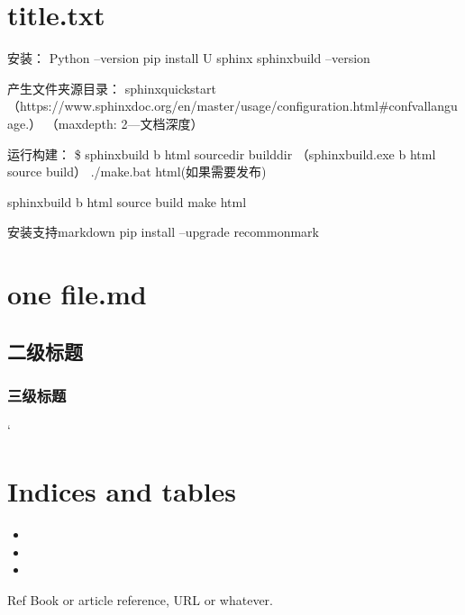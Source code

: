 \documentclass[letterpaper,10pt,english]{sphinxhowto}
\begin{document}
\section{title.txt}
\label{\detokenize{12.8:title-txt}}\label{\detokenize{12.8::doc}}
安装：
Python –version
pip install \sphinxhyphen{}U sphinx
sphinx\sphinxhyphen{}build –version

产生文件夹源目录：
sphinx\sphinxhyphen{}quickstart
（https://www.sphinx\sphinxhyphen{}doc.org/en/master/usage/configuration.html\#confval\sphinxhyphen{}language.）
（maxdepth: 2—文档深度）

运行构建：
\$ sphinx\sphinxhyphen{}build \sphinxhyphen{}b html sourcedir builddir
（sphinx\sphinxhyphen{}build.exe \sphinxhyphen{}b html source build）
./make.bat html(如果需要发布)

sphinx\sphinxhyphen{}build \sphinxhyphen{}b html source build
make html

安装支持markdown
pip install –upgrade recommonmark


\section{one file.md}
\label{\detokenize{aa:one-file-md}}\label{\detokenize{aa::doc}}

\subsection{二级标题}
\label{\detokenize{aa:id1}}

\subsubsection{三级标题}
\label{\detokenize{aa:id2}}
`


\section{Indices and tables}
\label{\detokenize{index:indices-and-tables}}\begin{itemize}
\item {} 

\item {} 

\item {} 

\end{itemize}

\begin{sphinxthebibliography}{Ref}
Book or article reference, URL or whatever.
\end{sphinxthebibliography}



\renewcommand{\indexname}{索引}

             {\footnotesize\raggedright\printindex}
             {\begin{sphinxtheindex}\end{sphinxtheindex}}
\end{document}
